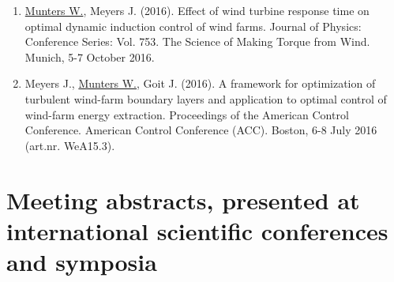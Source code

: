 \begin{enumerate}
\item \underline{Munters W.}, Meyers J. (2016). Effect of wind turbine response time on optimal dynamic induction control of wind farms. Journal of Physics: Conference Series: Vol. 753. The Science of Making Torque from Wind. Munich, 5-7 October 2016.

\item Meyers J., \underline{Munters W.}, Goit J. (2016). A framework for optimization of turbulent wind-farm boundary layers and application to optimal control of wind-farm energy extraction. Proceedings of the American Control Conference. American Control Conference (ACC). Boston, 6-8 July 2016 (art.nr. WeA15.3).
\end{enumerate}

\section*{Meeting abstracts, presented at international scientific conferences and symposia}

